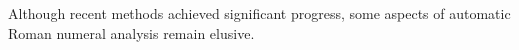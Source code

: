 

Although recent methods achieved significant progress, some aspects of automatic Roman numeral analysis remain elusive.
